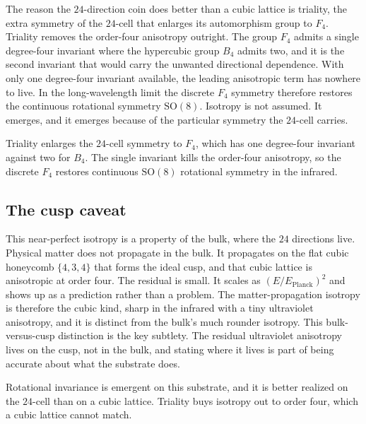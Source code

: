 The reason the $24$-direction coin does better than a cubic lattice is triality, the extra symmetry of the $24$-cell that enlarges its automorphism group to $F_4$. Triality removes the order-four anisotropy outright. The group $F_4$ admits a single degree-four invariant where the hypercubic group $B_4$ admits two, and it is the second invariant that would carry the unwanted directional dependence. With only one degree-four invariant available, the leading anisotropic term has nowhere to live. In the long-wavelength limit the discrete $F_4$ symmetry therefore restores the continuous rotational symmetry $\mathrm{SO}(8)$. Isotropy is not assumed. It emerges, and it emerges because of the particular symmetry the $24$-cell carries.

\begin{proposition}
Triality enlarges the $24$-cell symmetry to $F_4$, which has one degree-four invariant against two for $B_4$. The single invariant kills the order-four anisotropy, so the discrete $F_4$ restores continuous $\mathrm{SO}(8)$ rotational symmetry in the infrared.
\end{proposition}

\subsection{The cusp caveat}

This near-perfect isotropy is a property of the bulk, where the $24$ directions live. Physical matter does not propagate in the bulk. It propagates on the flat cubic honeycomb $\{4,3,4\}$ that forms the ideal cusp, and that cubic lattice is anisotropic at order four. The residual is small. It scales as $(E/E_{\mathrm{Planck}})^2$ and shows up as a prediction rather than a problem. The matter-propagation isotropy is therefore the cubic kind, sharp in the infrared with a tiny ultraviolet anisotropy, and it is distinct from the bulk's much rounder isotropy. This bulk-versus-cusp distinction is the key subtlety. The residual ultraviolet anisotropy lives on the cusp, not in the bulk, and stating where it lives is part of being accurate about what the substrate does.


Rotational invariance is emergent on this substrate, and it is better realized on the $24$-cell than on a cubic lattice. Triality buys isotropy out to order four, which a cubic lattice cannot match.

